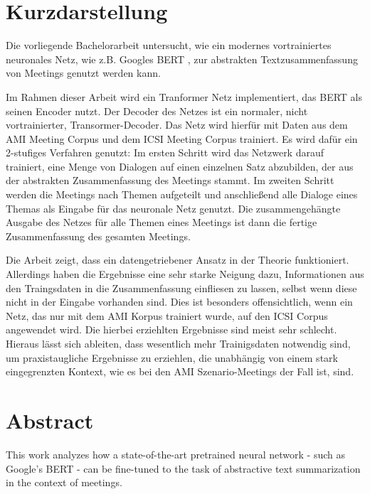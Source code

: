 \thispagestyle{empty}
\section*{Kurzdarstellung}
\label{sec:kurzdarstellung}

Die vorliegende Bachelorarbeit untersucht, wie ein modernes vortrainiertes neuronales Netz, wie z.B. Googles BERT \cite{devlin2018bert}, zur abstrakten Textzusammenfassung von Meetings genutzt werden kann.

Im Rahmen dieser Arbeit wird ein Tranformer Netz \cite{1706.03762} implementiert, das BERT als seinen Encoder nutzt.
Der Decoder des Netzes ist ein normaler, nicht vortrainierter, Transormer-Decoder.
Das Netz wird hierfür mit Daten aus dem AMI Meeting Corpus \cite{Mccowan05theami} und dem ICSI Meeting Corpus \cite{Janin} trainiert.
Es wird dafür ein 2-stufiges Verfahren genutzt:
Im ersten Schritt wird das Netzwerk darauf trainiert, eine Menge von Dialogen auf einen einzelnen Satz abzubilden, der aus der abstrakten Zusammenfassung des Meetings stammt.
Im zweiten Schritt werden die Meetings nach Themen aufgeteilt und anschließend alle Dialoge eines Themas als Eingabe für das neuronale Netz genutzt.
Die zusammengehängte Ausgabe des Netzes für alle Themen eines Meetings ist dann die fertige Zusammenfassung des gesamten Meetings.

Die Arbeit zeigt, dass ein datengetriebener Ansatz in der Theorie funktioniert.
Allerdings haben die Ergebnisse eine sehr starke Neigung dazu, Informationen aus den Traingsdaten in die Zusammenfassung einfliesen zu lassen, selbst wenn diese nicht in der Eingabe vorhanden sind.
Dies ist besonders offensichtlich, wenn ein Netz, das nur mit dem AMI Korpus trainiert wurde, auf den ICSI Corpus angewendet wird.
Die hierbei erziehlten Ergebnisse sind meist sehr schlecht.
Hieraus lässt sich ableiten, dass wesentlich mehr Trainigsdaten notwendig sind, um praxistaugliche Ergebnisse zu erziehlen, die unabhängig von einem stark eingegrenzten Kontext, wie es bei den AMI Szenario-Meetings der Fall ist, sind.


\section*{Abstract}
\label{sec:abstract}

This work analyzes how a state-of-the-art pretrained neural network - such as Google's BERT \cite{devlin2018bert} - can be fine-tuned to the task of abstractive text summarization in the context of meetings.

